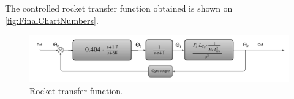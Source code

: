 The controlled rocket transfer function obtained is shown on  \autoref{fig:FinalChartNumbers}.


\begin{figure}[htbp]
	\centering
	
	\includegraphics[width=\textwidth]{figures/Rocket/design/final_chart_number}
	\caption{Rocket transfer function.}
	\label{fig:FinalChartNumbers}
	
\end{figure}